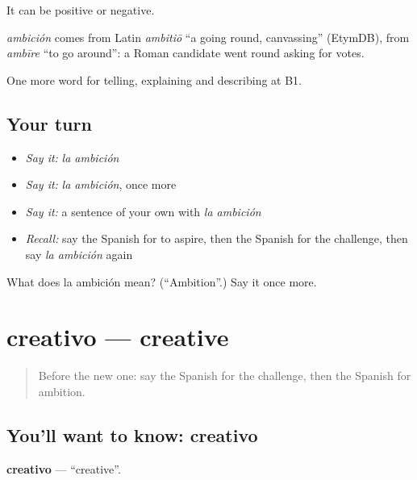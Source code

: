 It can be positive or negative.

\begin{cousinweb}
\emph{ambición} comes from Latin \emph{ambitiō} \textquotedblleft{}a going round, canvassing\textquotedblright{} (EtymDB), from \emph{ambīre} \textquotedblleft{}to go around\textquotedblright{}: a Roman candidate went round asking for votes.
\end{cousinweb}

\begin{grammarlens}[title={What you've built}]
One more word for telling, explaining and describing at B1.
\end{grammarlens}

\subsection*{Your turn}
\begin{itemize}
\raggedright
  \item \emph{Say it:} \emph{la ambición}
  \item \emph{Say it:} \emph{la ambición}, once more
  \item \emph{Say it:} a sentence of your own with \emph{la ambición}
  \item \emph{Recall:} say the Spanish for to aspire, then the Spanish for the challenge, then say \emph{la ambición} again
\end{itemize}

\begin{tcolorbox}[breakable,colback=teal!4,colframe=teal!35!black,title={Before you move on}]
What does la ambición mean? (\textquotedblleft{}Ambition\textquotedblright{}.) Say it once more.
\end{tcolorbox}
\section[creativo]{creativo — creative}

\label{lesson:ES-C766-creativo}



\begin{quote}
Before the new one: say the Spanish for the challenge, then the Spanish for ambition.
\end{quote}

\subsection*{You'll want to know: creativo}
\textbf{creativo} — \textquotedblleft{}creative\textquotedblright{}.

